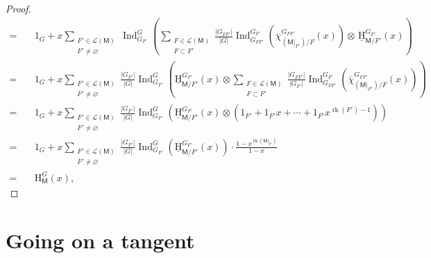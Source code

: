 \documentclass[11pt, a4paper, english]{amsart}
\theoremstyle{teoremas}
\theoremstyle{definition}
\DeclareMathOperator{\rk}{rk}
\newcommand{\M}{\mathsf{M}}
\renewcommand{\H}{\mathrm{H}}
\newcommand{\uH}{\underline{\mathrm{H}}}
\newcommand{\Ind}{\operatorname{Ind}}
\begin{document}
\begin{proof}
\begin{align}
        =\quad &1_G + x\sum_{\substack{F'\in \mathcal{L}(\M)\\F'\neq \varnothing}} \Ind_{G_{F'}}^G\left( \sum_{\substack{F\in \mathcal{L}(\M)\\F\subset F'}} \frac{|G_{FF'}|}{|G|}\Ind_{G_{FF'}}^{G_{F'}}\left(\overline{\chi}_{(\M|_{F'})/F}^{G_{FF'}}(x)\right)\otimes\, \uH_{\M/F'}^{G_{F'}}(x)\right)\nonumber\\
        =\quad &1_G + x\sum_{\substack{F'\in \mathcal{L}(\M)\\F'\neq \varnothing}} \frac{|G_{F'}|}{|G|}\Ind_{G_{F'}}^G\left(\uH_{\M/F'}^{G_{F'}}(x) \otimes\sum_{\substack{F\in \mathcal{L}(\M)\\F\subset F'}} \frac{|G_{FF'}|}{|G_{F'}|}\Ind_{G_{FF'}}^{G_{F'}}\left(\overline{\chi}_{(\M|_{F'})/F}^{G_{FF'}}(x)\right)\right)\nonumber\\
        =\quad &1_G + x\sum_{\substack{F'\in \mathcal{L}(\M)\\F'\neq \varnothing}} \frac{|G_{F'}|}{|G|}\Ind_{G_{F'}}^G\left(\uH_{\M/F'}^{G_{F'}}(x) \otimes \left(1_{F'} + 1_{F'}x +\cdots + 1_{F'}x^{\rk(F')-1}\right)\right)\\
        =\quad &1_G + x\sum_{\substack{F'\in \mathcal{L}(\M)\\F'\neq \varnothing}} \frac{|G_{F'}|}{|G|}\Ind_{G_{F'}}^G\left(\uH_{\M/F'}^{G_{F'}}(x)\right) \cdot \frac{1-x^{\rk(\M|_{F'})}}{1-x} \label{eq:sum-char-poly}\\
        =\quad &\H_{\M}^G(x),\nonumber
    \end{align}
\end{proof}

\section{Going on a tangent}



\end{document}
